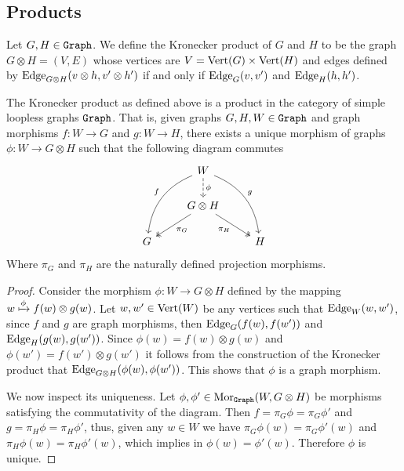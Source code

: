 \subsection{Products}

\begin{definition}
  Let \(G, H \in {\texttt{Graph}}\). We define the Kronecker product of \(G\) and \(H\) to
  be the graph \(G \otimes H = (V, E)\) whose vertices are \(V = \operatorname{Vert}(G) \times
  \operatorname{Vert}(H)\) and edges defined by \(\operatorname{Edge}_{G \otimes H}(v \otimes h, v' \otimes h')\) if
  and only if \(\operatorname{Edge}_G(v, v')\) and \(\operatorname{Edge}_H(h, h')\).
\end{definition}

\begin{proposition}[Products]
  The Kronecker product as defined above is a product in the category of simple
  loopless graphs \({\texttt{Graph}}\). That is, given graphs \(G, H, W \in {\texttt{Graph}}\) and
  graph morphisms \(f: W \to G\) and \(g: W \to H\), there exists a unique
  morphism of graphs \(\phi: W \to G \otimes H\) such that the following diagram
  commutes
  \[
    \begin{tikzcd}
      &W \ar[d, dashed, "\phi"]
      \ar[ddl, bend right, swap, "f"]
      \ar[ddr, bend left, "g"]
      & \\
      &G \otimes H
      \ar[dr, two heads, swap, "\pi_H"]
      \ar[dl, two heads, "\pi_G"]
      & \\
      G & &H
    \end{tikzcd}
  \]
  Where \(\pi_G\) and \(\pi_H\) are the naturally defined projection morphisms.
\end{proposition}

\begin{proof}
  Consider the morphism \(\phi: W \to G \otimes H\) defined by the mapping \(w
  \xmapsto \phi f(w) \otimes g(w)\). Let \(w, w' \in \operatorname{Vert}(W)\) be any vertices such
  that \(\operatorname{Edge}_W(w, w')\), since \(f\) and \(g\) are graph morphisms, then
  \(\operatorname{Edge}_G(f(w), f(w'))\) and \(\operatorname{Edge}_H(g(w), g(w'))\). Since \(\phi(w) = f(w) \otimes
  g(w)\) and \(\phi(w') = f(w') \otimes g(w')\) it follows from the construction
  of the Kronecker product that \(\operatorname{Edge}_{G \otimes H}(\phi(w), \phi(w'))\). This
  shows that \(\phi\) is a graph morphism.

  We now inspect its uniqueness. Let \(\phi, \phi' \in \operatorname{Mor}_{\texttt{Graph}}(W, G \otimes
  H)\) be morphisms satisfying the commutativity of the diagram. Then \(f =
  \pi_G \phi = \pi_G \phi'\) and \(g = \pi_H \phi = \pi_H \phi'\), thus, given
  any \(w \in W\) we have \(\pi_G\phi(w) = \pi_G \phi'(w)\) and \(\pi_H \phi(w)
  = \pi_H\phi'(w)\), which implies in \(\phi(w) = \phi'(w)\). Therefore \(\phi\)
  is unique.
\end{proof}
